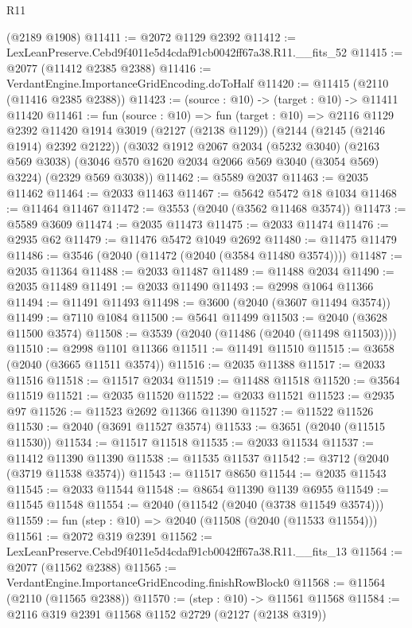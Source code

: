 \begin{lexlean}{R11}
\begin{coremodule}
    (@2189 @1908)
@11411 := @2072 @1129 @2392
@11412 := LexLeanPreserve.Cebd9f4011e5d4cdaf91cb0042ff67a38.R11.__fits_52
@11415 := @2077 (@11412 @2385 @2388)
@11416 := VerdantEngine.ImportanceGridEncoding.doToHalf
@11420 := @11415 (@2110 (@11416 @2385 @2388))
@11423 := (source : @10) -> (target : @10) -> @11411 @11420
@11461 := fun (source : @10) =>
  fun (target : @10) =>
  @2116
    @1129
    @2392
    @11420
    @1914
    @3019
    (@2127 (@2138 @1129))
    (@2144 (@2145 (@2146 @1914) @2392 @2122))
    (@3032
      @1912
      @2067
      @2034
      (@5232 @3040)
      (@2163 @569 @3038)
      (@3046 @570 @1620 @2034 @2066 @569 @3040 (@3054 @569) @3224)
      (@2329 @569 @3038))
@11462 := @5589 @2037
@11463 := @2035 @11462
@11464 := @2033 @11463
@11467 := @5642 @5472 @18 @1034
@11468 := @11464 @11467
@11472 := @3553 (@2040 (@3562 @11468 @3574))
@11473 := @5589 @3609
@11474 := @2035 @11473
@11475 := @2033 @11474
@11476 := @2935 @62
@11479 := @11476 @5472 @1049 @2692
@11480 := @11475 @11479
@11486 := @3546 (@2040 (@11472 (@2040 (@3584 @11480 @3574))))
@11487 := @2035 @11364
@11488 := @2033 @11487
@11489 := @11488 @2034
@11490 := @2035 @11489
@11491 := @2033 @11490
@11493 := @2998 @1064 @11366
@11494 := @11491 @11493
@11498 := @3600 (@2040 (@3607 @11494 @3574))
@11499 := @7110 @1084
@11500 := @5641 @11499
@11503 := @2040 (@3628 @11500 @3574)
@11508 := @3539 (@2040 (@11486 (@2040 (@11498 @11503))))
@11510 := @2998 @1101 @11366
@11511 := @11491 @11510
@11515 := @3658 (@2040 (@3665 @11511 @3574))
@11516 := @2035 @11388
@11517 := @2033 @11516
@11518 := @11517 @2034
@11519 := @11488 @11518
@11520 := @3564 @11519
@11521 := @2035 @11520
@11522 := @2033 @11521
@11523 := @2935 @97
@11526 := @11523 @2692 @11366 @11390
@11527 := @11522 @11526
@11530 := @2040 (@3691 @11527 @3574)
@11533 := @3651 (@2040 (@11515 @11530))
@11534 := @11517 @11518
@11535 := @2033 @11534
@11537 := @11412 @11390 @11390
@11538 := @11535 @11537
@11542 := @3712 (@2040 (@3719 @11538 @3574))
@11543 := @11517 @8650
@11544 := @2035 @11543
@11545 := @2033 @11544
@11548 := @8654 @11390 @1139 @6955
@11549 := @11545 @11548
@11554 := @2040 (@11542 (@2040 (@3738 @11549 @3574)))
@11559 := fun (step : @10) => @2040 (@11508 (@2040 (@11533 @11554)))
@11561 := @2072 @319 @2391
@11562 := LexLeanPreserve.Cebd9f4011e5d4cdaf91cb0042ff67a38.R11.__fits_13
@11564 := @2077 (@11562 @2388)
@11565 := VerdantEngine.ImportanceGridEncoding.finishRowBlock0
@11568 := @11564 (@2110 (@11565 @2388))
@11570 := (step : @10) -> @11561 @11568
@11584 := @2116
    @319
    @2391
    @11568
    @1152
    @2729
    (@2127 (@2138 @319))

\end{coremodule}
\end{lexlean}
